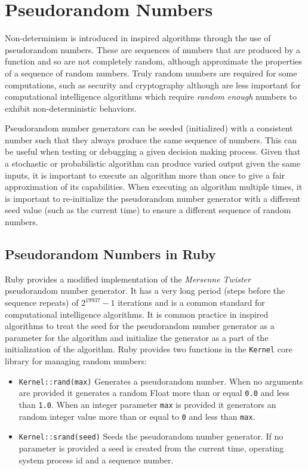 \section{Pseudorandom Numbers}
\label{ch:stochastic:sec:numbers}

Non-determinism is introduced in inspired algorithms through the use of pseudorandom numbers. These are sequences of numbers that are produced by a function and so are not completely random, although approximate the properties of a sequence of random numbers. Truly random numbers are required for some computations, such as security and cryptography although are less important for computational intelligence algorithms which require \emph{random enough} numbers to exhibit non-deterministic behaviors.


Pseudorandom number generators can be seeded (initialized) with a consistent number such that they always produce the same sequence of numbers. This can be useful when testing or debugging a given decision making process. Given that a stochastic or probabilistic algorithm can produce varied output given the same inputs, it is important to execute an algorithm more than once to give a fair approximation of its capabilities. When executing an algorithm multiple times, it is important to re-initialize the pseudorandom number generator with a different seed value (such as the current time) to ensure a different sequence of random numbers. 

\subsection{Pseudorandom Numbers in Ruby}
Ruby provides a modified implementation of the \emph{Mersenne Twister} pseudorandom number generator. It has a very long period (steps before the sequence repeats) of $2^{19937}-1$ iterations and is a common standard for computational intelligence algorithms. It is common practice in inspired algorithms to treat the seed for the pseudorandom number generator as a parameter for the algorithm and initialize the generator as a part of the initialization of the algorithm. Ruby provides two functions in the \texttt{Kernel} core library for managing random numbers:

\begin{itemize}	
	\item \texttt{Kernel::rand(max)} Generates a pseudorandom number. When no arguments are provided it generates a random Float more than or equal \texttt{0.0} and less than \texttt{1.0}. When an integer parameter \texttt{max} is provided it generators an random integer value more than or equal to \texttt{0} and less than \texttt{max}.
	\item \texttt{Kernel::srand(seed)} Seeds the pseudorandom number generator. If no parameter is provided a seed is created from the current time, operating system process id and a sequence number.
\end{itemize}

